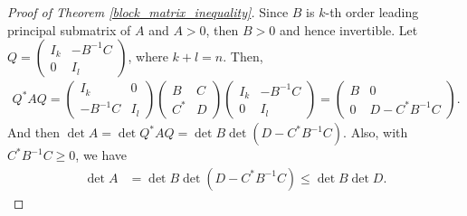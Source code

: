 \documentclass[10pt]{book}
\theoremstyle{definition}
\numberwithin{equation}{chapter}
\begin{document}
\begin{proof}[Proof of Theorem \ref{block_matrix_inequality}]
Since $B$ is $k$-th order leading principal submatrix of $A$ and $A > 0$, then $B > 0$ and hence invertible. Let $Q = \begin{pmatrix} I_k & -B^{-1}C \\ 0 & I_l \end{pmatrix}$, where $k + l = n$. Then,
\begin{align*}
    Q^* A Q = \begin{pmatrix} I_k & 0 \\ -B^{-1}C & I_l \end{pmatrix} \begin{pmatrix} B & C \\ C^* & D \end{pmatrix} \begin{pmatrix} I_k & -B^{-1}C \\ 0 & I_l \end{pmatrix} = \begin{pmatrix} B & 0 \\ 0 & D - C^*B^{-1}C \end{pmatrix}.
\end{align*}
And then $\det A = \det Q^* A Q = \det B \det (D - C^*B^{-1}C)$. Also, with $C^*B^{-1}C \geq 0$, we have
\begin{align*}
    \det A & = \det B \det (D - C^*B^{-1}C) \leq \det B \det D.
\end{align*}
\end{proof}
\end{document}
